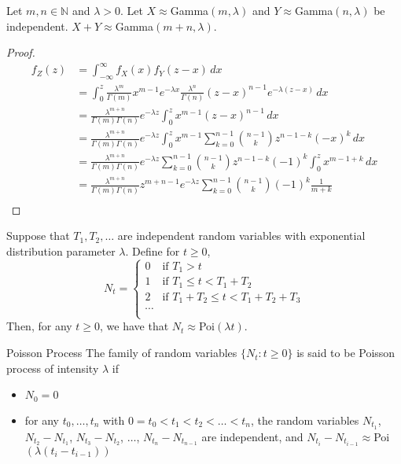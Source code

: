 \documentclass[a4paper]{article}
\begin{document}
\begin{prp}{}{} Let $m,n\in\mathbb{N}$ and $\lambda>0$. Let $X\approx$Gamma$(m,\lambda)$ and $Y\approx$Gamma$(n,\lambda)$ be independent. $X+Y\approx$Gamma$(m+n,\lambda)$. 
\end{prp}
\begin{proof}
\begin{align*}
f_Z(z)&=\int_{-\infty}^\infty f_X(x)f_Y(z-x)\,dx\\
&=\int_0^z\frac{\lambda^{m}}{\Gamma(m)}x^{m-1}e^{-\lambda x}\frac{\lambda^{n}}{\Gamma(n)}(z-x)^{n-1}e^{-\lambda(z-x)}\,dx\\
&=\frac{\lambda^{m+n}}{\Gamma(m)\Gamma(n)}e^{-\lambda z}\int_0^zx^{m-1}(z-x)^{n-1}\,dx\\
&=\frac{\lambda^{m+n}}{\Gamma(m)\Gamma(n)}e^{-\lambda z}\int_0^zx^{m-1}\sum_{k=0}^{n-1}\binom{n-1}{k}z^{n-1-k}(-x)^k\,dx\\
&=\frac{\lambda^{m+n}}{\Gamma(m)\Gamma(n)}e^{-\lambda z}\sum_{k=0}^{n-1}\binom{n-1}{k}z^{n-1-k}(-1)^k\int_0^zx^{m-1+k}\,dx\\
&=\frac{\lambda^{m+n}}{\Gamma(m)\Gamma(n)}z^{m+n-1}e^{-\lambda z}\sum_{k=0}^{n-1}\binom{n-1}{k}(-1)^k\frac{1}{m+k}\\
\end{align*}
\end{proof}

\begin{thm}{}{} Suppose that $T_1,T_2,\dots$ are independent random variables with exponential distribution parameter $\lambda$. Define for $t\geq0$, $$N_t=\begin{cases}
0&\text{if $T_1>t$}\\
1&\text{if $T_1\leq t<T_1+T_2$}\\
2&\text{if $T_1+T_2\leq t<T_1+T_2+T_3$}\\
\cdots\\
\end{cases}$$
Then, for any $t\geq0$, we have that $N_t\approx$Poi$(\lambda t)$. 
\end{thm}

\begin{defn}{Poisson Process}{} The family of random variables $\{N_t:t\geq 0\}$ is said to be Poisson process of intensity $\lambda$ if 
\begin{itemize}
\item $N_0=0$
\item for any $t_0,\dots,t_n$ with $0=t_0<t_1<t_2<\dots<t_n$, the random variables $N_{t_1}$, $N_{t_2}-N_{t_1}$, $N_{t_3}-N_{t_2}$, $\dots$, $N_{t_n}-N_{t_{n-1}}$ are independent, and $N_{t_i}-N_{t_{i-1}}\approx$Poi$(\lambda(t_i-t_{i-1}))$
\end{itemize}
\end{defn}
\end{document}
